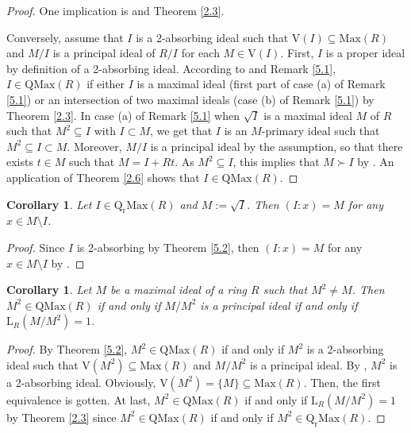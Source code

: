 \documentclass[12pt,leqno]{amsart}
\newtheorem{corollary}[theorem]{Corollary}
\theoremstyle{definition}
\begin{document}
\begin{proof} One implication is \cite[Theorem 1 and Definition 1]{AKKT} and Theorem \ref{2.3}. 

Conversely, assume that $I$ is a 2-absorbing ideal such that $\mathrm{V}(I)\subseteq\mathrm{Max}(R)$ and $M/I$ is a principal ideal of $R/I$ for each $M\in\mathrm{V}(I)$. First, $I$ is a proper ideal by definition of a 2-absorbing ideal. According to \cite[Theorem 2.3]{Ba} and Remark \ref{5.1}, $I\in\mathrm{QMax}(R)$ if either $I$ is a maximal ideal (first part of case (a) of Remark \ref{5.1}) or an intersection of two maximal ideals (case (b)  of Remark \ref{5.1}) by Theorem \ref{2.3}. In case (a) of Remark \ref{5.1} when $\sqrt I$ is a maximal ideal $M$ of $R$ such that $M^2\subseteq I$ with $I\subset M$, we get that $I$ is an $M$-primary ideal such that $M^2 \subseteq I\subset M$. Moreover, $M/I$ is a principal ideal by the assumption, so that there exists $t\in M$ such that $M=I+Rt$. As $M^2 \subseteq I$, this implies that $M\succ I$ by \cite[Corollary 2, p.237]{ZS}. An application of Theorem \ref{2.6} shows that $I\in\mathrm{QMax}(R)$.
\end{proof} 

\begin{corollary}\label{5.3} Let $I\in\mathrm{Q_rMax}( R)$ and $M:=\sqrt I$. Then $(I:x)=M$ for any $x\in M\setminus I$.
\end{corollary}

\begin{proof} Since $I$ is  2-absorbing by Theorem \ref{5.2}, then $(I:x)=M$ for any $x\in M\setminus I$ by \cite[Theorem 2.5]{Ba}. 
\end{proof} 

\begin{corollary}\label{5.4} Let $M$ be a maximal ideal of a ring $R$ such that $M^2\neq M$. Then $M^2\in\mathrm{QMax}(R)$ if and only if $M/M^2$ is a principal ideal if and only if $\mathrm{L}_R(M/M^2)=1$.
\end{corollary}

\begin{proof} By Theorem \ref{5.2}, $M^2\in\mathrm{QMax}(R)$ if and only if $M^2$ is a 2-absorbing ideal such that $\mathrm{V}(M^2)\subseteq\mathrm{Max}(R)$ and $M/M^2$ is a principal ideal. By \cite[Theorem 3.1]{Ba}, $M^2$ is a 2-absorbing ideal. Obviously, $\mathrm{V}(M^2)=\{M\}\subseteq\mathrm{Max}(R)$. Then, the first equivalence is gotten. At last, $M^2\in\mathrm{QMax}(R)$ if and only if $\mathrm{L}_R(M/M^2)=1$ by  Theorem \ref{2.3} since $M^2\in\mathrm{QMax}(R)$ if and only if $M^2\in\mathrm{Q_rMax}( R)$.
\end{proof} 
\end{document}
